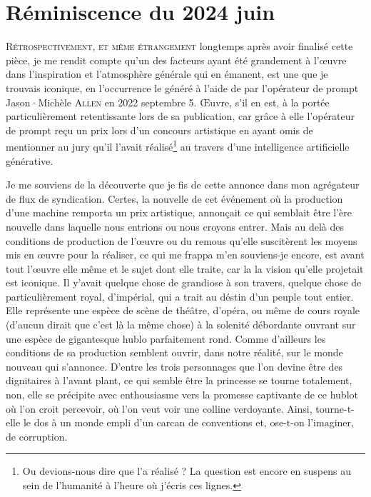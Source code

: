 
\chapter{Réminiscence du 2024 juin}

\lettrine[lines=3]{R}{étrospectivement, et même étrangement}
 longtemps après avoir finalisé cette pièce, je me rendit compte qu’un des facteurs ayant été grandement à l’œuvre dans l’inspiration et l’atmosphère générale qui en émanent, est une  que je trouvais iconique, en l’occurrence le  généré à l’aide de  par l’opérateur de prompt Jason·Michèle \textsc{Allen} en 2022 septembre 5. Œuvre, s’il en est, à la portée particulièrement retentissante lors de sa publication, car grâce à elle l’opérateur de prompt reçu un prix lors d’un concours artistique en ayant omis de mentionner au jury qu’il l’avait réalisé\footnote{Ou devions-nous dire que  l’a réalisé ? La question est encore en suspens au sein de l’humanité à l’heure où j’écris ces lignes.} au travers d’une intelligence artificielle générative.


Je me souviens de la découverte que je fis de cette annonce dans mon agrégateur de flux de syndication. Certes, la nouvelle de cet événement où la production d’une machine remporta un prix artistique, annonçait ce qui semblait être l’ère nouvelle dans laquelle nous entrions ou nous croyons entrer. Mais au delà des conditions de production de l’œuvre ou du remous qu’elle suscitèrent les moyens mis en œuvre pour la réaliser, ce qui me frappa m’en souviens-je encore, est avant tout l’œuvre elle même et le sujet dont elle traite, car la la vision qu’elle projetait est iconique. Il y’avait quelque chose de grandiose à son travers, quelque chose de particulièrement royal, d’impérial, qui a trait au déstin d’un peuple tout entier. Elle représente une espèce de scène de théâtre, d’opéra, ou même de cours royale (d’aucun dirait que c’est là la même chose) à la solenité débordante ouvrant sur une espèce de gigantesque hublo parfaitement rond. Comme d’ailleurs les conditions de sa production semblent ouvrir, dans notre réalité, sur le monde nouveau qui s’annonce.
D’entre les trois personnages que l’on devine être des dignitaires à l’avant plant, ce qui semble être la princesse se tourne totalement, non, elle se précipite avec enthousiasme vers la promesse captivante de ce hublot où l’on croit percevoir, où l’on veut voir une colline verdoyante. Ainsi, tourne-t-elle le dos à un monde empli d’un carcan de conventions et, ose-t-on l’imaginer, de corruption.

